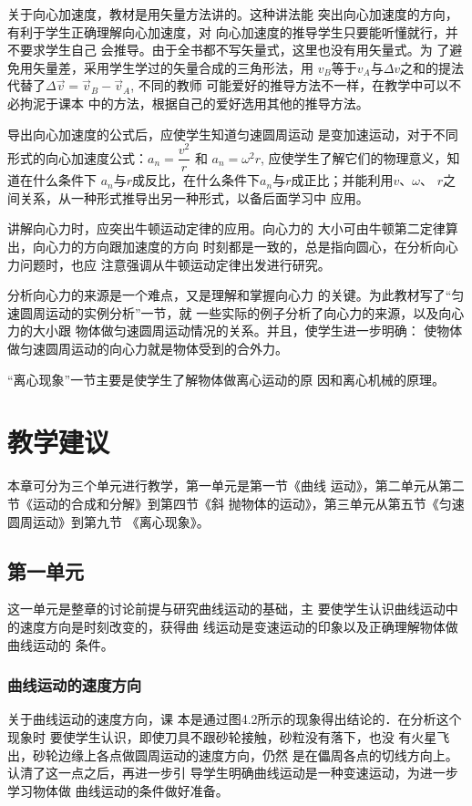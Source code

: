 关于向心加速度，教材是用矢量方法讲的。这种讲法能
突出向心加速度的方向，有利于学生正确理解向心加速度，对
向心加速度的推导学生只要能听懂就行，并不要求学生自己
会推导。由于全书都不写矢量式，这里也没有用矢量式。为
了避免用矢量差，采用学生学过的矢量合成的三角形法，用
$v_B$等于$v_A$与$\Delta v$之和的提法代替了$\Delta \vec{v}=\vec{v}_B-\vec{v}_A$, 不同的教师
可能爱好的推导方法不一样，在教学中可以不必拘泥于课本
中的方法，根据自己的爱好选用其他的推导方法。

导出向心加速度的公式后，应使学生知道匀速圆周运动
是变加速运动，对于不同形式的向心加速度公式：$a_n=\dfrac{v^2}{r}$
和
$a_n=\omega^2 r$, 应使学生了解它们的物理意义，知道在什么条件下
$a_n$与$r$成反比，在什么条件下$a_n$与$r$成正比；并能利用$v$、$\omega$、
$r$之间关系，从一种形式推导出另一种形式，以备后面学习中
应用。

讲解向心力时，应突出牛顿运动定律的应用。向心力的
大小可由牛顿第二定律算出，向心力的方向跟加速度的方向
时刻都是一致的，总是指向圆心，在分析向心力问题时，也应
注意强调从牛顿运动定律出发进行研究。

分析向心力的来源是一个难点，又是理解和掌握向心力
的关键。为此教材写了“匀速圆周运动的实例分析”一节，就
一些实际的例子分析了向心力的来源，以及向心力的大小跟
物体做匀速圆周运动情况的关系。并且，使学生进一步明确：
使物体做匀速圆周运动的向心力就是物体受到的合外力。

“离心现象”一节主要是使学生了解物体做离心运动的原
因和离心机械的原理。

\section{教学建议}
本章可分为三个单元进行教学，第一单元是第一节《曲线
运动》，第二单元从第二节《运动的合成和分解》到第四节《斜
抛物体的运动》，第三单元从第五节《匀速圆周运动》到第九节
《离心现象》。

\subsection{第一单元}
这一单元是整章的讨论前提与研究曲线运动的基础，主
要使学生认识曲线运动中的速度方向是时刻改变的，获得曲
线运动是变速运动的印象以及正确理解物体做曲线运动的
条件。

\subsubsection{曲线运动的速度方向}

关于曲线运动的速度方向，课
本是通过图4.2所示的现象得出结论的．在分析这个现象时
要使学生认识，即使刀具不跟砂轮接触，砂粒没有落下，也没
有火星飞出，砂轮边缘上各点做圆周运动的速度方向，仍然
是在儡周各点的切线方向上。认清了这一点之后，再进一步引
导学生明确曲线运动是一种变速运动，为进一步学习物体做
曲线运动的条件做好准备。


